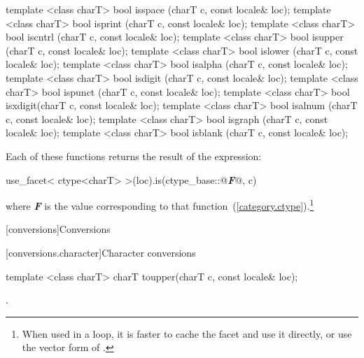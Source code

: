 %
%
%
%
%
%
%
%
%
%
%
%
\begin{itemdecl}
template <class charT> bool isspace (charT c, const locale& loc);
template <class charT> bool isprint (charT c, const locale& loc);
template <class charT> bool iscntrl (charT c, const locale& loc);
template <class charT> bool isupper (charT c, const locale& loc);
template <class charT> bool islower (charT c, const locale& loc);
template <class charT> bool isalpha (charT c, const locale& loc);
template <class charT> bool isdigit (charT c, const locale& loc);
template <class charT> bool ispunct (charT c, const locale& loc);
template <class charT> bool isxdigit(charT c, const locale& loc);
template <class charT> bool isalnum (charT c, const locale& loc);
template <class charT> bool isgraph (charT c, const locale& loc);
template <class charT> bool isblank (charT c, const locale& loc);
\end{itemdecl}

\pnum
Each of these functions
returns the result of the expression:

\begin{codeblock}
use_facet< ctype<charT> >(loc).is(ctype_base::@\textbf{\textit{F}}@, c)
\end{codeblock}

where \textbf{\textit{F}} is the
value corresponding to that function~(\ref{category.ctype}).\footnote{When
used in a loop, it is faster to cache the
facet and use it directly, or use the vector form of
.}

[conversions]{Conversions}

[conversions.character]{Character conversions}

%
\begin{itemdecl}
template <class charT> charT toupper(charT c, const locale& loc);
\end{itemdecl}

\begin{itemdescr}
\pnum
\returns
{}.
\end{itemdescr}

